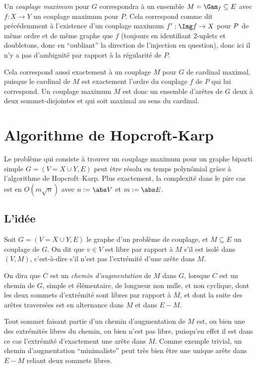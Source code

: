  Un \emph{couplage maximum} pour $G$ correspondra à un ensemble $M = \Gam_f \subseteq E$ avec $f :X \to Y$ un couplage maximum pour $P$. Cela correspond comme dit précédemment à l'existence d'un couplage maximum $f' : \Img f \to  X $ pour $P\-$ de même ordre et de même graphe que $f$ (toujours en identifiant 2-uplets et doubletons, donc en ``oubliant'' la direction de l'injection en question), donc ici il n'y a pas d'ambiguité par rapport à la régularité de $P$.
 
 Cela correspond aussi exactement à un couplage $M$ pour $G$ de cardinal maximal, puisque le cardinal de $M$ est exactement l'ordre du couplage $f$ de $P$ qui lui correspond. Un couplage maximum $M$ est donc un ensemble d'arêtes de $G$ deux à deux sommet-disjointes et qui soit maximal au sens du cardinal.
 \SEP
 
 \section{Algorithme de Hopcroft-Karp}
 
 Le problème qui consiste à trouver un couplage maximum pour un graphe biparti simple $G = (V = X \cup Y,E)$ peut être résolu en temps polynômial grâce à l'algorithme de Hopcroft–Karp. Plus exactement, la complexité dans le pire cas est en $O(m \sqrt n)$ avec $n := \abs V$ et $m := \abs E$.
 
 \subsection{L'idée}
 
 \SEP\jdefi Soit $G = (V = X \cup Y, E)$ le graphe d'un problème de couplage, et $M \subseteq E$ un couplage de $G$. On dit que $v \in V$ est libre par rapport à $M$ s'il est isolé dans $(V,M)$, c'est-à-dire s'il n'est pas l'extrémité d'une arête dans $M$.
 
 On dira que $C$ est un \emph{chemin d'augmentation} de $M$ dans $G$, lorsque $C$ est un chemin de $G$, simple et élémentaire, de longueur non nulle, et non cyclique, dont les deux sommets d'extrémité sont libres par rapport à $M$, et dont la suite des arêtes traversées est en alternance dans $M$ et dans $E \minus M$.
 \SEP
 
 Tout sommet faisant partie d'un chemin d'augmentation de $M$ est, ou bien une des extrémités libres du chemin, ou bien n'est pas libre, puisqu'en effet il est dans ce cas l'extrémité d'exactement une arête dans $M$. Comme exemple trivial, un chemin d'augmentation ``minimaliste'' peut très bien être une unique arête dans $E\minus M$ reliant deux sommets libres.
 
